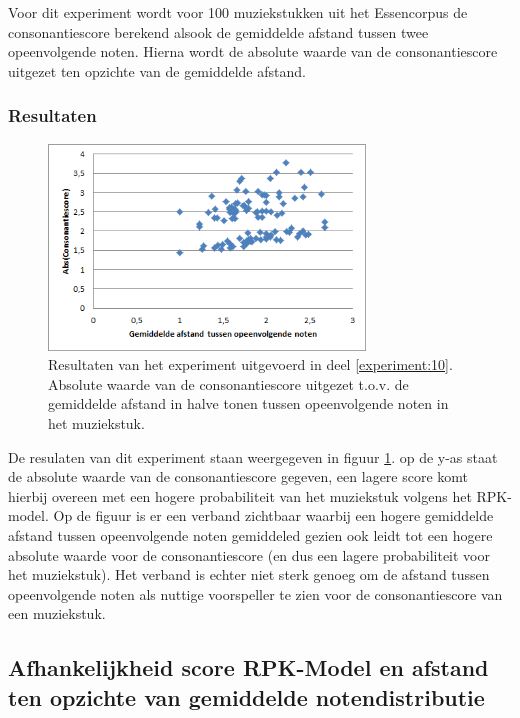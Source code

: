 Voor dit experiment wordt voor 100 muziekstukken uit het Essencorpus de consonantiescore berekend alsook de gemiddelde afstand tussen twee opeenvolgende noten. Hierna wordt de absolute waarde van de consonantiescore uitgezet ten opzichte van de gemiddelde afstand. 

\subsubsection{Resultaten}
\begin{figure}[!ht]
  \centering
  \includegraphics[width=0.75\textwidth]{5_Experimenten_Resultaten/exp10_res}
  \caption{Resultaten van het experiment uitgevoerd in deel \ref{experiment:10}. Absolute waarde van de consonantiescore uitgezet t.o.v. de gemiddelde afstand in halve tonen tussen opeenvolgende noten in het muziekstuk.}
  \label{figuur:exp10}
\end{figure}

De resulaten van dit experiment staan weergegeven in figuur \ref{figuur:exp10}. op de y-as staat de absolute waarde van de consonantiescore gegeven, een lagere score komt hierbij overeen met een hogere probabiliteit van het muziekstuk volgens het RPK-model. Op de figuur is er een verband zichtbaar waarbij een hogere gemiddelde afstand tussen opeenvolgende noten gemiddeled gezien ook leidt tot een hogere absolute waarde voor de consonantiescore (en dus een lagere probabiliteit voor het muziekstuk). Het verband is echter niet sterk genoeg om de afstand tussen opeenvolgende noten als nuttige voorspeller te zien voor de consonantiescore van een muziekstuk.

\subsection{Afhankelijkheid score RPK-Model en afstand ten opzichte van gemiddelde notendistributie}
\label{experiment:11}
